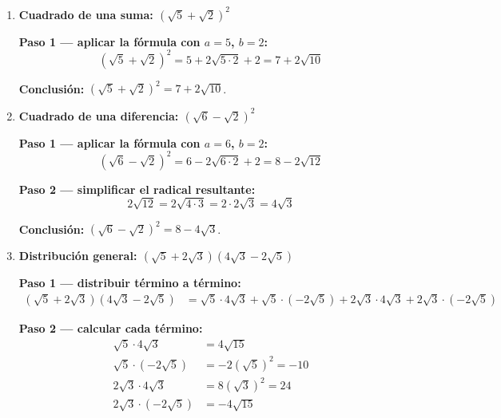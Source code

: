 \documentclass[11pt, letterpaper]{article}
\begin{document}
\begin{tcolorbox}[examplebox, title={Ejemplos}]
\begin{enumerate}[label=\textbf{Ej. \arabic*.}, leftmargin=*, itemsep=18pt]
\textbf{Paso 1 — reconocer la forma $(\sqrt{a}+\sqrt{b})(\sqrt{a}-\sqrt{b})$ con $a=7$, $b=3$:}
$$(\sqrt{7}+\sqrt{3})(\sqrt{7}-\sqrt{3}) = (\sqrt{7})^2 - (\sqrt{3})^2 = 7 - 3 = 4$$

\textbf{Conclusión:} $(\sqrt{7}+\sqrt{3})(\sqrt{7}-\sqrt{3}) = 4$.

\textit{Nota: el resultado es un número entero, sin radicales. Esto es siempre así con la diferencia de cuadrados cuando $a$ y $b$ son enteros.}

\item \textbf{Cuadrado de una suma: $(\sqrt{5}+\sqrt{2})^2$}

\textbf{Paso 1 — aplicar la fórmula con $a=5$, $b=2$:}
$$(\sqrt{5}+\sqrt{2})^2 = 5 + 2\sqrt{5 \cdot 2} + 2 = 7 + 2\sqrt{10}$$

\textbf{Conclusión:} $(\sqrt{5}+\sqrt{2})^2 = 7 + 2\sqrt{10}$.

\item \textbf{Cuadrado de una diferencia: $(\sqrt{6}-\sqrt{2})^2$}

\textbf{Paso 1 — aplicar la fórmula con $a=6$, $b=2$:}
$$(\sqrt{6}-\sqrt{2})^2 = 6 - 2\sqrt{6 \cdot 2} + 2 = 8 - 2\sqrt{12}$$

\textbf{Paso 2 — simplificar el radical resultante:}
$$2\sqrt{12} = 2\sqrt{4 \cdot 3} = 2 \cdot 2\sqrt{3} = 4\sqrt{3}$$

\textbf{Conclusión:} $(\sqrt{6}-\sqrt{2})^2 = 8 - 4\sqrt{3}$.

\item \textbf{Distribución general: $(\sqrt{5}+2\sqrt{3})(4\sqrt{3}-2\sqrt{5})$}

\textbf{Paso 1 — distribuir término a término:}
\begin{align*}
(\sqrt{5}+2\sqrt{3})(4\sqrt{3}-2\sqrt{5})
&= \sqrt{5}\cdot 4\sqrt{3} + \sqrt{5}\cdot(-2\sqrt{5}) + 2\sqrt{3}\cdot 4\sqrt{3} + 2\sqrt{3}\cdot(-2\sqrt{5})
\end{align*}

\textbf{Paso 2 — calcular cada término:}
\begin{align*}
\sqrt{5}\cdot 4\sqrt{3} &= 4\sqrt{15}\\
\sqrt{5}\cdot(-2\sqrt{5}) &= -2(\sqrt{5})^2 = -10\\
2\sqrt{3}\cdot 4\sqrt{3} &= 8(\sqrt{3})^2 = 24\\
2\sqrt{3}\cdot(-2\sqrt{5}) &= -4\sqrt{15}
\end{align*}


\end{enumerate}
\end{tcolorbox}
\end{document}
